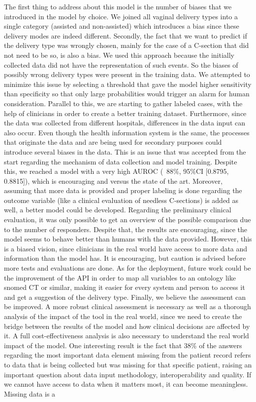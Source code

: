 
The first thing to address about this model is the number of biases that we introduced in the model by choice. We joined all vaginal delivery types into a single category (assisted and non-assisted) which introduces a bias since these delivery modes are indeed different. Secondly, the fact that we want to predict if the delivery type was wrongly chosen, mainly for the case of a C-section that did not need to be so, is also a bias. We used this approach because the initially collected data did not have the representation of such events. So the biases of possibly wrong delivery types were present in the training data. We attempted to minimize this issue by selecting a threshold that gave the model higher sensitivity than specificity so that only large probabilities would trigger an alarm for human consideration. Parallel to this, we are starting to gather labeled cases, with the help of clinicians in order to create a better training dataset. Furthermore, since the data was collected from different hospitals, differences in the data input can also occur. Even though the health information system is the same, the processes that originate the data and are being used for secondary purposes could introduce several biases in the data. This is an issue that was accepted from the start regarding the mechanism of data collection and model training. Despite this, we reached a model with a very high AUROC (~88\%, 95\%CI [0.8795, 0.8815]), which is encouraging and versus the state of the art. Moreover, assuming that more data is provided and proper labeling is done regarding the outcome variable (like a clinical evaluation of needless C-sections) is added as well, a better model could be developed. Regarding the preliminary clinical evaluation, it was only possible to get an overview of the possible comparison due to the number of responders. Despite that, the results are encouraging, since the model seems to behave better than humans with the data provided. However, this is a biased vision, since clinicians in the real world have access to more data and information than the model has. It is encouraging, but caution is advised before more tests and evaluations are done. As for the deployment, future work could be the improvement of the API in order to map all variables to an ontology like snomed CT or similar, making it easier for every system and person to access it and get a suggestion of the delivery type. Finally, we believe the assessment can be improved. A more robust clinical assessment is necessary as well as a thorough analysis of the impact of the tool in the real world, since we need to create the bridge between the results of the model and how clinical decisions are affected by it. A full cost-effectiveness analysis is also necessary to understand the real world impact of the model. One interesting result is the fact that 38\% of the answers regarding the most important data element missing from the patient record refers to data that is being collected but was missing for that specific patient, raising an important question about data input methodology, interoperability and quality. If we cannot have access to data when it matters most, it can become meaningless. Missing data is a 